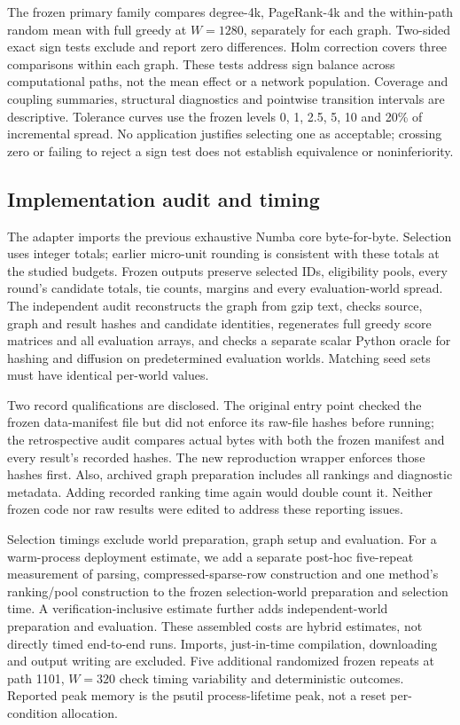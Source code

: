 \documentclass[smallextended]{svjour3}
\begin{document}
The frozen primary family compares degree-4k, PageRank-4k and the within-path random mean with full greedy at $W=1280$, separately for each graph. Two-sided exact sign tests exclude and report zero differences. Holm correction covers three comparisons within each graph. These tests address sign balance across computational paths, not the mean effect or a network population. Coverage and coupling summaries, structural diagnostics and pointwise transition intervals are descriptive. Tolerance curves use the frozen levels 0, 1, 2.5, 5, 10 and 20\% of incremental spread. No application justifies selecting one as acceptable; crossing zero or failing to reject a sign test does not establish equivalence or noninferiority.

\subsection{Implementation audit and timing}
The adapter imports the previous exhaustive Numba core byte-for-byte. Selection uses integer totals; earlier micro-unit rounding is consistent with these totals at the studied budgets. Frozen outputs preserve selected IDs, eligibility pools, every round's candidate totals, tie counts, margins and every evaluation-world spread. The independent audit reconstructs the graph from gzip text, checks source, graph and result hashes and candidate identities, regenerates full greedy score matrices and all evaluation arrays, and checks a separate scalar Python oracle for hashing and diffusion on predetermined evaluation worlds. Matching seed sets must have identical per-world values.

Two record qualifications are disclosed. The original entry point checked the frozen data-manifest file but did not enforce its raw-file hashes before running; the retrospective audit compares actual bytes with both the frozen manifest and every result's recorded hashes. The new reproduction wrapper enforces those hashes first. Also, archived graph preparation includes all rankings and diagnostic metadata. Adding recorded ranking time again would double count it. Neither frozen code nor raw results were edited to address these reporting issues.

Selection timings exclude world preparation, graph setup and evaluation. For a warm-process deployment estimate, we add a separate post-hoc five-repeat measurement of parsing, compressed-sparse-row construction and one method's ranking/pool construction to the frozen selection-world preparation and selection time. A verification-inclusive estimate further adds independent-world preparation and evaluation. These assembled costs are hybrid estimates, not directly timed end-to-end runs. Imports, just-in-time compilation, downloading and output writing are excluded. Five additional randomized frozen repeats at path 1101, $W=320$ check timing variability and deterministic outcomes. Reported peak memory is the psutil process-lifetime peak, not a reset per-condition allocation.
\end{document}
